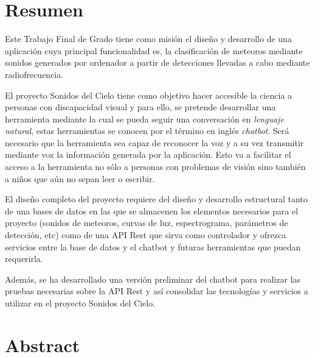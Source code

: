 \chapter*{Resumen}

Este Trabajo Final de Grado tiene como misión el diseño y desarrollo de una aplicación cuya principal funcionalidad es, la clasificación de  meteoros mediante sonidos generados por ordenador a partir de detecciones llevadas a cabo mediante radiofrecuencia. 

El proyecto Sonidos del Cielo tiene como objetivo hacer accesible la ciencia a personas con discapacidad visual y para ello, se pretende desarrollar una herramienta mediante la cual se pueda seguir una conversación en \textit{lenguaje natural}, estas herramientas se conocen por el término en inglés \textit{chatbot}. Será necesario que la herramienta sea capaz de reconocer la voz y a su vez transmitir mediante voz la información generada por la aplicación. Esto va a facilitar el acceso a la herramienta no sólo a personas con problemas de visión sino también a niños que aún no sepan leer o escribir.

El diseño completo del proyecto requiere del diseño y desarrollo estructural tanto de una bases de datos en las que se almacenen los elementos necesarios para el proyecto (sonidos de meteoros, curvas de luz, espectrograma, parámetros de detección, etc) como de una API Rest que sirva como controlador y ofrezca servicios entre la base de datos y el chatbot y futuras herramientas que puedan requerirla.

Además, se ha desarrollado una versión preliminar del chatbot para realizar las pruebas necesarias sobre la API Rest y así consolidar las tecnologías y servicios a utilizar en el proyecto Sonidos del Cielo.





\newpage

\chapter*{Abstract}

